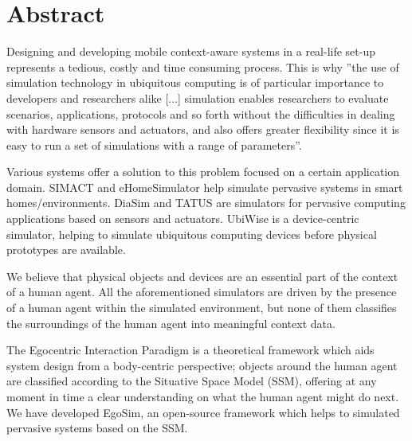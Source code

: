 \begingroup
\let\clearpage\relax
\let\cleardoublepage\relax
\let\cleardoublepage\relax

\chapter*{Abstract}
Designing and developing mobile context-aware systems in a real-life set-up represents a tedious, costly and time consuming process. This is why ''the use of simulation technology in ubiquitous computing is of particular importance to developers and researchers alike [...] simulation enables researchers to evaluate scenarios, applications, protocols and so forth without the difficulties in dealing with hardware sensors and actuators, and also offers greater flexibility since it is easy to run a set of simulations with a range of parameters''\cite{reynolds2006requirements}.

Various systems offer a solution to this problem focused on a certain application domain. SIMACT \cite{bouchard2012simact} and eHomeSimulator \cite{armac2007simulation} help simulate pervasive systems in smart homes/environments. DiaSim \cite{bruneau2013diasim} and TATUS \cite{o2005testbed} are simulators for pervasive computing applications based on sensors and actuators. UbiWise \cite{barton2003ubiwise} is a device-centric simulator, helping to simulate ubiquitous computing devices before physical prototypes are available.

We believe that physical objects and devices are an essential part of the context of a human agent. All the aforementioned simulators are driven by the presence of a human agent within the simulated environment, but none of them classifies the surroundings of the human agent into meaningful context data.
 
The Egocentric Interaction Paradigm is a theoretical framework which aids system design from a body-centric perspective; objects around the human agent are classified according to the Situative Space Model (SSM), offering at any moment in time a clear understanding on what the human agent might do next. We have developed EgoSim, an open-source framework which helps to simulated pervasive systems based on the SSM.


